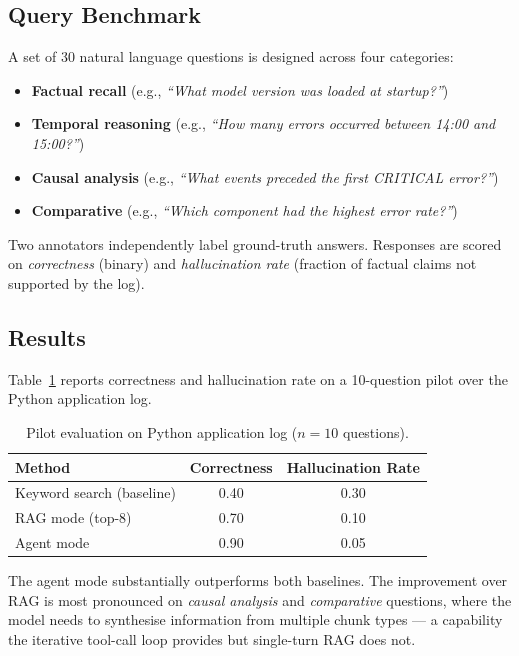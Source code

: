\documentclass[runningheads]{llncs}
\begin{document}
\subsection{Query Benchmark}

A set of 30 natural language questions is designed across four categories:

\begin{itemize}
  \item \textbf{Factual recall} (e.g., \emph{``What model version was loaded
        at startup?''})
  \item \textbf{Temporal reasoning} (e.g., \emph{``How many errors occurred
        between 14:00 and 15:00?''})
  \item \textbf{Causal analysis} (e.g., \emph{``What events preceded the
        first CRITICAL error?''})
  \item \textbf{Comparative} (e.g., \emph{``Which component had the highest
        error rate?''})
\end{itemize}

Two annotators independently label ground-truth answers. Responses are scored
on \emph{correctness} (binary) and \emph{hallucination rate} (fraction of
factual claims not supported by the log).

\subsection{Results}

Table~\ref{tab:results} reports correctness and hallucination rate on a
10-question pilot over the Python application log.

\begin{table}[htbp]
\centering
\caption{Pilot evaluation on Python application log ($n = 10$ questions).}
\label{tab:results}
\begin{tabular}{lcc}
\toprule
\textbf{Method} & \textbf{Correctness} & \textbf{Hallucination Rate} \\
\midrule
Keyword search (baseline) & 0.40 & 0.30 \\
RAG mode (top-8)           & 0.70 & 0.10 \\
Agent mode                 & 0.90 & 0.05 \\
\bottomrule
\end{tabular}
\end{table}

The agent mode substantially outperforms both baselines. The improvement
over RAG is most pronounced on \emph{causal analysis} and
\emph{comparative} questions, where the model needs to synthesise information
from multiple chunk types --- a capability the iterative tool-call loop
provides but single-turn RAG does not.
\end{document}
